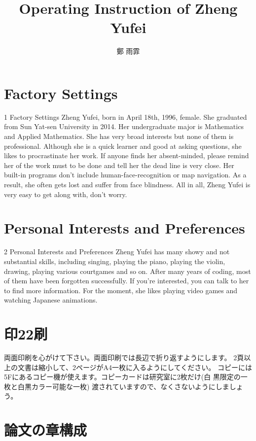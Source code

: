 \documentclass[a4]{jarticle}
\title{Operating Instruction of Zheng Yufei}
\author{鄭 雨霏} %
\begin{document}
    \twocolumn{
    \maketitle
    }

    \section{Factory Settings}


    1 Factory Settings
    Zheng Yufei, born in April 18th, 1996, female. She graduated from
    Sun Yat-sen University in 2014. Her undergraduate major is Mathematics
    and Applied Mathematics. She has very broad interests but none of
    them is professional. Although she is a quick learner and good at
    asking questions, she likes to procrastinate her work. If anyone ﬁnds
    her absent-minded, please remind her of the work must to be done and
    tell her the dead line is very close. Her built-in programs don’t
    include human-face-recognition or map navigation. As a result, she
    often gets lost and suﬀer from face blindness. All in all, Zheng Yufei
    is very easy to get along with, don’t worry.


    \section{Personal Interests and Preferences}


    2 Personal Interests and Preferences
    Zheng Yufei has many showy and not substantial skills, including singing,
    playing the piano, playing the violin, drawing, playing various courtgames
    and so on. After many years of coding, most of them have been forgotten
    successfully. If you're interested, you can talk to her to find more information.
    For the moment, she likes playing video games and watching Japanese animations.

    \section{印22刷}
    両面印刷を心がけて下さい。両面印刷では長辺で折り返すようにします。
    2頁以上の文書は縮小して、2ページがA4一枚に入るようにしてください。
    コピーには5Fにあるコピー機が使えます。コピーカードは研究室に2枚だけ(白
    黒限定の一枚と白黒カラー可能な一枚)
    渡されていますので、なくさないようにしましょう。

    \section{論文の章構成}
\end{document}
